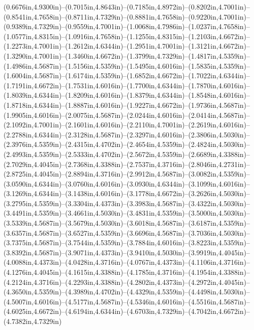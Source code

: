 (0.6676in,4.9300in)--(0.7015in,4.8643in)--(0.7185in,4.8972in)--(0.8202in,4.7001in)--(0.8541in,4.7658in)--(0.8711in,4.7329in)--(0.8881in,4.7658in)--(0.9220in,4.7001in)--(0.9389in,4.7329in)--(0.9559in,4.7001in)--(1.0068in,4.7986in)--(1.0237in,4.7658in)--(1.0577in,4.8315in)--(1.0916in,4.7658in)--(1.1255in,4.8315in)--(1.2103in,4.6672in)--(1.2273in,4.7001in)--(1.2612in,4.6344in)--(1.2951in,4.7001in)--(1.3121in,4.6672in)--(1.3290in,4.7001in)--(1.3460in,4.6672in)--(1.3799in,4.7329in)--(1.4817in,4.5359in)--(1.4986in,4.5687in)--(1.5156in,4.5359in)--(1.5495in,4.6016in)--(1.5835in,4.5359in)--(1.6004in,4.5687in)--(1.6174in,4.5359in)--(1.6852in,4.6672in)--(1.7022in,4.6344in)--(1.7191in,4.6672in)--(1.7531in,4.6016in)--(1.7700in,4.6344in)--(1.7870in,4.6016in)--(1.8039in,4.6344in)--(1.8209in,4.6016in)--(1.8379in,4.6344in)--(1.8548in,4.6016in)--(1.8718in,4.6344in)--(1.8887in,4.6016in)--(1.9227in,4.6672in)--(1.9736in,4.5687in)--(1.9905in,4.6016in)--(2.0075in,4.5687in)--(2.0244in,4.6016in)--(2.0414in,4.5687in)--(2.1092in,4.7001in)--(2.1601in,4.6016in)--(2.2110in,4.7001in)--(2.2619in,4.6016in)--(2.2788in,4.6344in)--(2.3128in,4.5687in)--(2.3297in,4.6016in)--(2.3806in,4.5030in)--(2.3976in,4.5359in)--(2.4315in,4.4702in)--(2.4654in,4.5359in)--(2.4824in,4.5030in)--(2.4993in,4.5359in)--(2.5333in,4.4702in)--(2.5672in,4.5359in)--(2.6689in,4.3388in)--(2.7029in,4.4045in)--(2.7368in,4.3388in)--(2.7537in,4.3716in)--(2.8046in,4.2731in)--(2.8725in,4.4045in)--(2.8894in,4.3716in)--(2.9912in,4.5687in)--(3.0082in,4.5359in)--(3.0590in,4.6344in)--(3.0760in,4.6016in)--(3.0930in,4.6344in)--(3.1099in,4.6016in)--(3.1269in,4.6344in)--(3.1438in,4.6016in)--(3.1778in,4.6672in)--(3.2626in,4.5030in)--(3.2795in,4.5359in)--(3.3304in,4.4373in)--(3.3983in,4.5687in)--(3.4322in,4.5030in)--(3.4491in,4.5359in)--(3.4661in,4.5030in)--(3.4831in,4.5359in)--(3.5000in,4.5030in)--(3.5339in,4.5687in)--(3.5679in,4.5030in)--(3.6018in,4.5687in)--(3.6187in,4.5359in)--(3.6357in,4.5687in)--(3.6527in,4.5359in)--(3.6696in,4.5687in)--(3.7036in,4.5030in)--(3.7375in,4.5687in)--(3.7544in,4.5359in)--(3.7884in,4.6016in)--(3.8223in,4.5359in)--(3.8392in,4.5687in)--(3.9071in,4.4373in)--(3.9410in,4.5030in)--(3.9919in,4.4045in)--(4.0088in,4.4373in)--(4.0428in,4.3716in)--(4.0767in,4.4373in)--(4.1106in,4.3716in)--(4.1276in,4.4045in)--(4.1615in,4.3388in)--(4.1785in,4.3716in)--(4.1954in,4.3388in)--(4.2124in,4.3716in)--(4.2293in,4.3388in)--(4.2802in,4.4373in)--(4.2972in,4.4045in)--(4.3650in,4.5359in)--(4.3989in,4.4702in)--(4.4329in,4.5359in)--(4.4498in,4.5030in)--(4.5007in,4.6016in)--(4.5177in,4.5687in)--(4.5346in,4.6016in)--(4.5516in,4.5687in)--(4.6025in,4.6672in)--(4.6194in,4.6344in)--(4.6703in,4.7329in)--(4.7042in,4.6672in)--(4.7382in,4.7329in) 